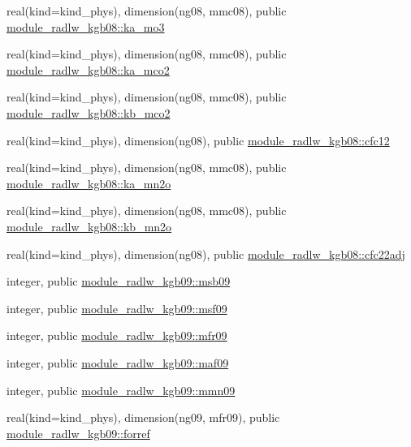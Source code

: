 \begin{DoxyCompactItemize}
\item 
real(kind=kind\+\_\+phys), dimension(ng08, mmc08), public \hyperlink{group__module__radlw__main_ga7dec65e880c278f44419c1ae01490eae}{module\+\_\+radlw\+\_\+kgb08\+::ka\+\_\+mo3}
\item 
real(kind=kind\+\_\+phys), dimension(ng08, mmc08), public \hyperlink{group__module__radlw__main_ga0fcd13503b3253ec6aab0aa52056f634}{module\+\_\+radlw\+\_\+kgb08\+::ka\+\_\+mco2}
\item 
real(kind=kind\+\_\+phys), dimension(ng08, mmc08), public \hyperlink{group__module__radlw__main_ga9a85770aee1b88b9323d9466c1772ec4}{module\+\_\+radlw\+\_\+kgb08\+::kb\+\_\+mco2}
\item 
real(kind=kind\+\_\+phys), dimension(ng08), public \hyperlink{group__module__radlw__main_ga010239f14788bc1ed9953133e30a62fd}{module\+\_\+radlw\+\_\+kgb08\+::cfc12}
\item 
real(kind=kind\+\_\+phys), dimension(ng08, mmc08), public \hyperlink{group__module__radlw__main_ga61949dc331e9a58d4f2a31b625481795}{module\+\_\+radlw\+\_\+kgb08\+::ka\+\_\+mn2o}
\item 
real(kind=kind\+\_\+phys), dimension(ng08, mmc08), public \hyperlink{group__module__radlw__main_ga9a8e2f789421acc307e37b03478efb4b}{module\+\_\+radlw\+\_\+kgb08\+::kb\+\_\+mn2o}
\item 
real(kind=kind\+\_\+phys), dimension(ng08), public \hyperlink{group__module__radlw__main_ga38a3ce7d8f3db6b732511cf78ef735db}{module\+\_\+radlw\+\_\+kgb08\+::cfc22adj}
\item 
integer, public \hyperlink{group__module__radlw__main_ga7e6bb7acb0df29586d0bd52f3fc41d90}{module\+\_\+radlw\+\_\+kgb09\+::msb09}
\item 
integer, public \hyperlink{group__module__radlw__main_ga7d728ef04b3f26c6b20149084334be5a}{module\+\_\+radlw\+\_\+kgb09\+::msf09}
\item 
integer, public \hyperlink{group__module__radlw__main_ga777f63022c4f7187446945c6e6ba77e7}{module\+\_\+radlw\+\_\+kgb09\+::mfr09}
\item 
integer, public \hyperlink{group__module__radlw__main_ga7d5d565c87af7ef07dc17930f9cb9e57}{module\+\_\+radlw\+\_\+kgb09\+::maf09}
\item 
integer, public \hyperlink{group__module__radlw__main_gaa9c8294b56ac3ce90b07114e986777a9}{module\+\_\+radlw\+\_\+kgb09\+::mmn09}
\item 
real(kind=kind\+\_\+phys), dimension(ng09, mfr09), public \hyperlink{group__module__radlw__main_ga72a8c0879636dba20e2a8a35ba79f681}{module\+\_\+radlw\+\_\+kgb09\+::forref}

\end{DoxyCompactItemize}
